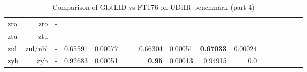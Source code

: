 \documentclass[11pt]{article}
\def\udhr{UDHR\xspace}
\def\ft176{FT176\xspace}
\begin{document}
\begin{table*}[h]
{\begin{tabular}{lrrrrrrrrrrrrrrrr}
zro         & zro         & -         &          &          &          &          &          &          &          &          &          &          &          &          \\
ztu         & ztu         & -         &          &          &          &          &          &          &          &          &          &          &          &          \\
zul         & zul/nbl         & -         & 0.65591         & 0.00077         &          &          & 0.66304         & 0.00051         & \textbf{\underline{0.67033}}         & 0.00024         &          &          &          &          \\
zyb         & zyb         & -         & 0.92683         & 0.00051         &          &          & \textbf{\underline{0.95}}         & 0.00013         & 0.94915         & 0.0         &          &          &          &          \\
\end{tabular}
}
\caption{Comparison of GlotLID vs \ft176 on \udhr benchmark (part 4)}
\label{tab:appendix_glotlid_ft176_udhr_4}
\end{table*}
 
\end{document}
